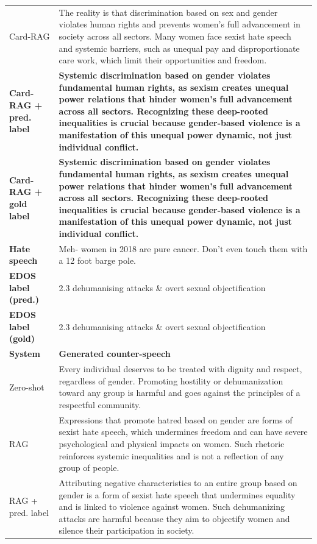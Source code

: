 \begin{table}[t]
\begin{tabularx}{\textwidth}{@{}p{}X@{}}
Card-RAG & The reality is that discrimination based on sex and gender violates human rights and prevents women's full advancement in society across all sectors. Many women face sexist hate speech and systemic barriers, such as unequal pay and disproportionate care work, which limit their opportunities and freedom. \\
\textbf{Card-RAG + pred. label} & \textbf{Systemic discrimination based on gender violates fundamental human rights, as sexism creates unequal power relations that hinder women's full advancement across all sectors. Recognizing these deep-rooted inequalities is crucial because gender-based violence is a manifestation of this unequal power dynamic, not just individual conflict.} \\
\textbf{Card-RAG + gold label} & \textbf{Systemic discrimination based on gender violates fundamental human rights, as sexism creates unequal power relations that hinder women's full advancement across all sectors. Recognizing these deep-rooted inequalities is crucial because gender-based violence is a manifestation of this unequal power dynamic, not just individual conflict.} \\
\midrule[\heavyrulewidth]
\textbf{Hate speech} & Meh- women in 2018 are pure cancer. Don't even touch them with a 12 foot barge pole. \\
\textbf{EDOS label (pred.)} & 2.3 dehumanising attacks \& overt sexual objectification \\
\textbf{EDOS label (gold)} & 2.3 dehumanising attacks \& overt sexual objectification \\
\midrule
\textbf{System} & \textbf{Generated counter-speech} \\
Zero-shot & Every individual deserves to be treated with dignity and respect, regardless of gender. Promoting hostility or dehumanization toward any group is harmful and goes against the principles of a respectful community. \\
RAG & Expressions that promote hatred based on gender are forms of sexist hate speech, which undermines freedom and can have severe psychological and physical impacts on women. Such rhetoric reinforces systemic inequalities and is not a reflection of any group of people. \\
RAG + pred. label & Attributing negative characteristics to an entire group based on gender is a form of sexist hate speech that undermines equality and is linked to violence against women. Such dehumanizing attacks are harmful because they aim to objectify women and silence their participation in society. \\

\end{tabularx}
\end{table}
